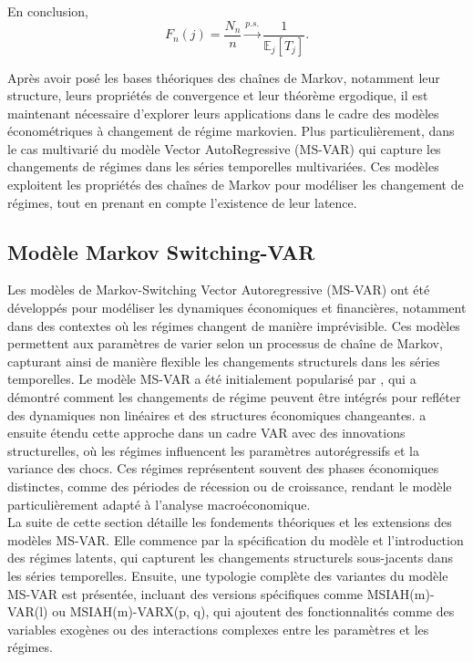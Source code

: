 \begin{sloppypar}
En conclusion, 
\[
F_n(j) = \frac{N_n}{n} \xrightarrow{p.s.} \frac{1}{\mathbb{E}_j[T_j]}.
\]

Après avoir posé les bases théoriques des chaînes de Markov, notamment leur structure, leurs propriétés de convergence et leur théorème ergodique, il est maintenant nécessaire d’explorer leurs applications dans le cadre des modèles économétriques à changement de régime markovien. Plus particulièrement, dans le cas multivarié du modèle Vector AutoRegressive (MS-VAR) qui capture les changements de régimes dans les séries temporelles multivariées. Ces modèles exploitent les propriétés des chaînes de Markov pour modéliser les changement de régimes, tout en prenant en compte l’existence de leur latence.

\subsection{Modèle Markov Switching-VAR}

Les modèles de Markov-Switching Vector Autoregressive (MS-VAR) ont été développés pour modéliser les dynamiques économiques et financières, notamment dans des contextes où les régimes changent de manière imprévisible. Ces modèles permettent aux paramètres de varier selon un processus de chaîne de Markov, capturant ainsi de manière flexible les changements structurels dans les séries temporelles. Le modèle MS-VAR a été initialement popularisé par \cite[1989]{Hamilton}, qui a démontré comment les changements de régime peuvent être intégrés pour refléter des dynamiques non linéaires et des structures économiques changeantes. \cite[1994]{Hamilton} a ensuite étendu cette approche dans un cadre VAR avec des innovations structurelles, où les régimes influencent les paramètres autorégressifs et la variance des chocs. Ces régimes représentent souvent des phases économiques distinctes, comme des périodes de récession ou de croissance, rendant le modèle particulièrement adapté à l'analyse macroéconomique.\\

La suite de cette section détaille les fondements théoriques et les extensions des modèles MS-VAR. Elle commence par la spécification du modèle et l'introduction des régimes latents, qui capturent les changements structurels sous-jacents dans les séries temporelles. Ensuite, une typologie complète des variantes du modèle MS-VAR est présentée, incluant des versions spécifiques comme MSIAH(m)-VAR(l) ou MSIAH(m)-VARX(p, q), qui ajoutent des fonctionnalités comme des variables exogènes ou des interactions complexes entre les paramètres et les régimes.\\


\end{sloppypar}
